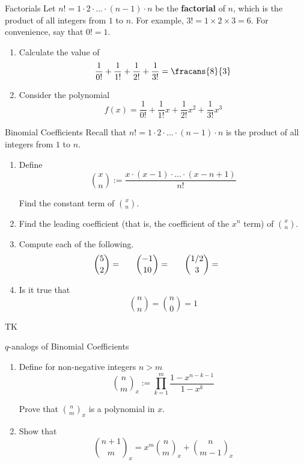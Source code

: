 \documentclass[12pt,letterpaper]{article}
\begin{document}
\begin{problem}{Factorials}
  Let \(n! = 1 \cdot 2 \cdot \dots \cdot (n-1) \cdot n\) be the \textbf{factorial} of \(n\),
  which is the product of all integers from \(1\) to \(n\). For example, \(3! = 1 \times 2
  \times 3 = 6\). For convenience, say that \(0! = 1\).

  \begin{enumerate}
    \item Calculate the value of \[
      \frac{1}{0!} + \frac{1}{1!} + \frac{1}{2!} + \frac{1}{3!} = \fracans{8}{3}
    \]
    \item Consider the polynomial \[
      f(x) = \frac{1}{0!} + \frac{1}{1!}x + \frac{1}{2!}x^2 + \frac{1}{3!}x^3
    \]
  \end{enumerate}
\end{problem}

\begin{problem}{Binomial Coefficients}
  Recall that \(n! = 1\cdot2 \cdot \dots \cdot (n-1) \cdot n\) is the product
  of all integers from \(1\) to \(n\).

  \begin{enumerate}
    \item Define \[
      \binom{x}{n} := \frac{x\cdot(x-1)\cdot\dots\cdot(x-n+1)}{n!}
    \]

    Find the constant term of \(\binom{x}{n}\).
    \item Find the leading coefficient (that is, the coefficient of the \(x^n\)
    term) of \(\binom{x}{n}\).
    \item Compute each of the following. \[
      \binom{5}{2} = \hspace{4ex}
      \binom{-1}{10} = \hspace{4ex}
      \binom{1/2}{3} = \hspace{4ex}
    \]
    \item Is it true that \[
      \binom{n}{n} = \binom{n}{0} = 1
    \]
  \end{enumerate}
\end{problem}

TK

\begin{problem}{\(q\)-analogs of Binomial Coefficients}
  \begin{enumerate}
    \item Define for non-negative integers \(n > m\) \[
      \binom{n}{m}_x := \prod_{k=1}^{m} \frac{1-x^{n-k-1}}{1-x^{k}}
    \]

    Prove that \(\binom{n}{m}_x\) is a polynomial in \(x\).
    \item Show that \[
      \binom{n+1}{m}_x = x^m \binom{n}{m}_x + \binom{n}{m-1}_x
    \]
  \end{enumerate}
\end{problem}
\end{document}
